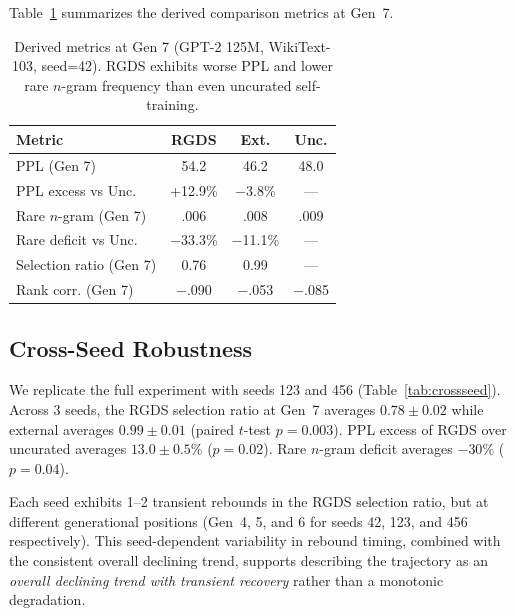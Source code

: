 \documentclass[11pt,a4paper]{article}
\begin{document}
Table~\ref{tab:derived} summarizes the derived comparison metrics at Gen~7.

\begin{table}[t]
\centering
\small
\begin{tabular}{lccc}
\toprule
Metric & RGDS & Ext. & Unc. \\
\midrule
PPL (Gen 7) & 54.2 & 46.2 & 48.0 \\
PPL excess vs Unc. & +12.9\% & $-$3.8\% & --- \\
Rare $n$-gram (Gen 7) & .006 & .008 & .009 \\
Rare deficit vs Unc. & $-$33.3\% & $-$11.1\% & --- \\
Selection ratio (Gen 7) & 0.76 & 0.99 & --- \\
Rank corr. (Gen 7) & $-$.090 & $-$.053 & $-$.085 \\
\bottomrule
\end{tabular}
\caption{Derived metrics at Gen 7 (GPT-2 125M, WikiText-103, seed=42). RGDS exhibits worse PPL and lower rare $n$-gram frequency than even uncurated self-training.}
\label{tab:derived}
\end{table}

\subsection{Cross-Seed Robustness}
\label{sec:seeds}

We replicate the full experiment with seeds 123 and 456 (Table~\ref{tab:crossseed}).
Across 3 seeds, the RGDS selection ratio at Gen~7 averages $0.78 \pm 0.02$ while external averages $0.99 \pm 0.01$ (paired $t$-test $p{=}0.003$).
PPL excess of RGDS over uncurated averages $13.0 \pm 0.5\%$ ($p{=}0.02$).
Rare $n$-gram deficit averages $-30\%$ ($p{=}0.04$).

Each seed exhibits 1--2 transient rebounds in the RGDS selection ratio, but at different generational positions (Gen~4, 5, and 6 for seeds 42, 123, and 456 respectively).
This seed-dependent variability in rebound timing, combined with the consistent overall declining trend, supports describing the trajectory as an \emph{overall declining trend with transient recovery} rather than a monotonic degradation.
\end{document}
